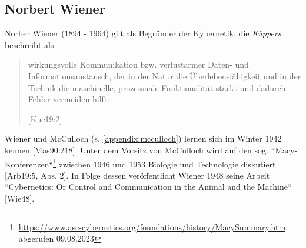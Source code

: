 \subsection{Norbert Wiener}\label{appendix:wiener}

Norber Wiener (1894 - 1964) gilt als Begründer der Kybernetik, die \textit{Küppers} beschreibt als

\blockquote[{[Kue19:2]}]{
    wirkungsvolle Kommunikation bzw. verlustarmer Daten- und Informationsaustausch, der in der Natur die Überlebensfähigkeit und in der Technik die maschinelle, prozessuale Funktionalität stärkt und dadurch Fehler vermeiden hilft.
}

Wiener und McCulloch (s. \ref{appendix:mcculloch}) lernen sich im Winter 1942 kennen [Mas90:218].
Unter dem Vorsitz von McCulloch wird auf den sog. ``Macy-Konferenzen``\footnote{
    \url{https://www.asc-cybernetics.org/foundations/history/MacySummary.htm}, abgerufen 09.08.2023
} zwischen 1946 und 1953 Biologie und Technologie diskutiert [Arb19:5, Abs. 2].
In Folge dessen veröffentlicht Wiener 1948 seine Arbeit ``Cybernetics: Or Control and Communication in the Animal and the Machine`` [Wie48].